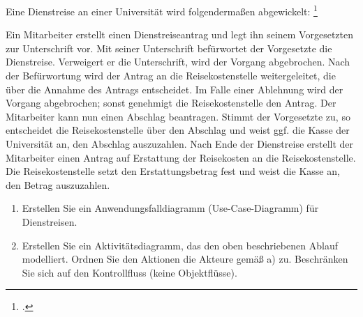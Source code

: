 \documentclass{bschlangaul-aufgabe}
\begin{document}

Eine Dienstreise an einer Universität wird folgendermaßen abgewickelt:
\footcite{examen:66116:2019:09}

Ein Mitarbeiter erstellt einen Dienstreiseantrag und legt ihn seinem
Vorgesetzten zur Unterschrift vor. Mit seiner Unterschrift befürwortet
der Vorgesetzte die Dienstreise. Verweigert er die Unterschrift, wird
der Vorgang abgebrochen. Nach der Befürwortung wird der Antrag an die
Reisekostenstelle weitergeleitet, die über die Annahme des Antrags
entscheidet. Im Falle einer Ablehnung wird der Vorgang abgebrochen;
sonst genehmigt die Reisekostenstelle den Antrag. Der Mitarbeiter kann
nun einen Abschlag beantragen. Stimmt der Vorgesetzte zu, so entscheidet
die Reisekostenstelle über den Abschlag und weist ggf. die Kasse der
Universität an, den Abschlag auszuzahlen. Nach Ende der Dienstreise
erstellt der Mitarbeiter einen Antrag auf Erstattung der Reisekosten an
die Reisekostenstelle. Die Reisekostenstelle setzt den Erstattungsbetrag
fest und weist die Kasse an, den Betrag auszuzahlen.

\begin{enumerate}

\item Erstellen Sie ein Anwendungsfalldiagramm (Use-Case-Diagramm) für
Dienstreisen.


\item Erstellen Sie ein Aktivitätsdiagramm, das den oben beschriebenen
Ablauf modelliert. Ordnen Sie den Aktionen die Akteure gemäß a) zu.
Beschränken Sie sich auf den Kontrollfluss (keine Objektflüsse).
\end{enumerate}
\end{document}
